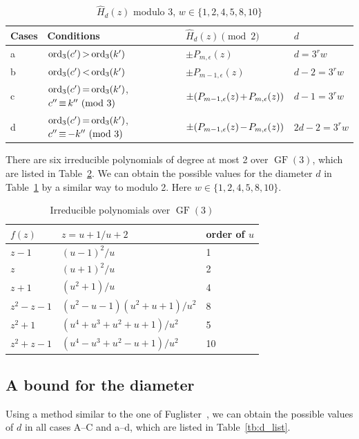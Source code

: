 \documentclass[ALCO,ThmDefs,Unicode,epreuves]{cedram}
\DeclareMathOperator{\ord}{ord}
\DeclareMathOperator{\GF}{GF}
\newcommand*{\Mk}{\mkern -2mu}
\begin{document}
\begin{table}[htb]\centering
 \caption{$\hat{H}_d(z)$ modulo 3, $w \in \{1,2,4,5,8,10\}$} \label{tb:mod3_1}
\renewcommand{\arraystretch}{1.3}
\renewcommand{\tabcolsep}{3pt}
\begin{tabular}{|l|l|l|l|} \hline
Cases & Conditions& $\hat{H}_{d}(z) \pmod{2}$ & $d$ \\ \hline
a& $\ord_3(c')\Mk >\Mk \ord_3(k')$ & $\pm P_{m,\epsilon}(z)$ &
$d=3^r w$ \\
b& $\ord_3(c')\Mk <\Mk \ord_3(k')$ & $\pm P_{m-1,\epsilon}(z)$ &
$d-2=3^r w$ \\
c& $\ord_3(c')\Mk =\Mk \ord_3(k')$, $c''\Mk \equiv\Mk k'' \Mk \pmod{3} $ & $\pm (P_{m-1,\epsilon}(z)\Mk +\Mk P_{m,\epsilon}(z))$ &
$d-1=3^r w$ \\
d& $\ord_3(c')\Mk =\Mk \ord_3(k')$, $c''\Mk \equiv\Mk - k''\Mk \pmod{3} $ & $\pm (P_{m-1,\epsilon}(z)\Mk -\Mk P_{m,\epsilon}(z))$ &
$2d-2=3^r w$\\
\hline
\end{tabular}
\end{table} 


There are six irreducible polynomials of degree at most 2 over $\GF (3)$, which are listed in Table~\ref{tb:mod3_2}. 
We can obtain the possible values for the diameter $d$ in Table~\ref{tb:mod3_1} by a similar way to modulo 2. Here $w \in \{1,2,4,5,8,10 \}$.

\eject

\begin{table}[htb]
\centering
\renewcommand{\arraystretch}{1.3}
\caption{Irreducible polynomials over $\GF (3)$} \label{tb:mod3_2}
\begin{tabular}{|l|l|l|}
\hline 
$f(z)$ & $z=u+1/u+2$ & order of $u$ \\ \hline
$z-1$ & $(u-1)^2/u$ & 1 \\
$z$ & $(u+1)^2/u$ & 2\\
$z+1$ & $(u^2+1)/u$ & 4 \\
$z^2-z-1$ & $(u^2-u-1)(u^2+u+1)/u^2$ & 8 \\
$z^2+1$ & $(u^4+u^3+u^2+u+1)/u^2$ & 5 \\ 
$z^2+z-1$ & $(u^4-u^3+u^2-u+1)/u^2$ & 10 \\ 
\hline
\end{tabular}
\end{table} 

\subsection{A bound for the diameter}
Using a method similar to the one of Fuglister~\cite{F87}, we can 
obtain the possible values of $d$ in all cases A--C and a--d, which are listed in Table~\ref{tb:d_list}. 
\end{document}
